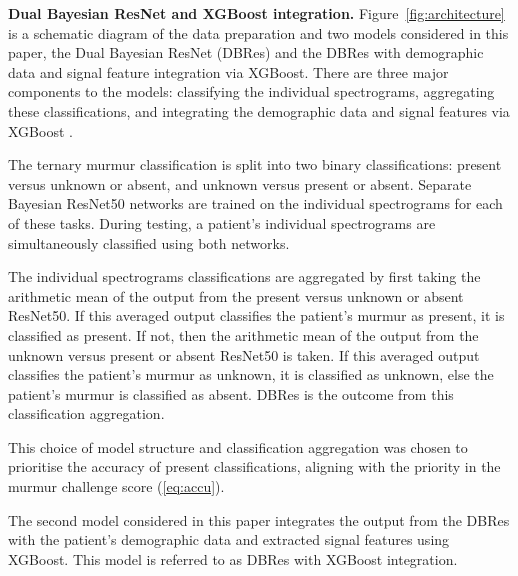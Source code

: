 \documentclass[twocolumn]{cinc}
\begin{document}
{\bf Dual Bayesian ResNet and XGBoost integration.} Figure~\ref{fig:architecture} is a schematic diagram of the data preparation and two models considered in this paper, the Dual Bayesian ResNet (DBRes) and the DBRes with demographic data and signal feature integration via XGBoost. There are three major components to the models: classifying the individual spectrograms, aggregating these classifications, and integrating the demographic data and signal features via XGBoost \cite{pimentel2019uncertainty}.

The ternary murmur classification is split into two binary classifications: present versus unknown or absent, and unknown versus present or absent. Separate Bayesian ResNet50 networks are trained on the individual spectrograms for each of these tasks. During testing, a patient's individual spectrograms are simultaneously classified using both networks.

The individual spectrograms classifications are aggregated by first taking the arithmetic mean of the output from the present versus unknown or absent ResNet50. If this averaged output classifies the patient's murmur as present, it is classified as present. If not, then the arithmetic mean of the output from the unknown versus present or absent ResNet50 is taken. If this averaged output classifies the patient's murmur as unknown, it is classified as unknown, else the patient's murmur is classified as absent. DBRes is the outcome from this classification aggregation.

This choice of model structure and classification aggregation was chosen to prioritise the accuracy of present classifications, aligning with the priority in the murmur challenge score (\ref{eq:accu}). 

The second model considered in this paper integrates the output from the DBRes with the patient's demographic data and extracted signal features using XGBoost. This model is referred to as DBRes with XGBoost integration.

 
\end{document}
